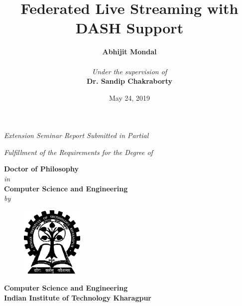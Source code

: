 \title{\bf{Federated Live Streaming with DASH Support}}
\date{}
\author{}
\maketitle
\thispagestyle{empty}
\begin{center}
	\vspace*{5mm}
	\textit{Extension Seminar Report Submitted in Partial}
	\par
	\vspace*{4mm}
	\textit{Fulfillment of the Requirements for the Degree of}
	\par
	\vspace*{5mm}
	{\large\textbf{Doctor of Philosophy}\\
		\vspace*{2mm}\textit{in}\\
		\vspace*{2mm}\large\textbf{Computer Science and Engineering}
		\\\vspace*{2mm}\textit{by}\\
		\vspace*{2mm}}
	\author{\large\textbf{Abhijit Mondal}\\
		\vspace*{2mm}{\small{[Roll No - 15CS91R09]}}\\
		\vspace*{15mm}\textit{Under the supervision of}\\
		\vspace*{2mm}\textbf{Dr. Sandip Chakraborty}\\}
	\vspace*{30mm}
	\begin{figure}[!ht]
		\centering
		\includegraphics[width=3cm]{img/iit_logo}
	\end{figure}
	\bf{Computer Science and Engineering
		\\Indian Institute of Technology Kharagpur
	}\\
	\date{May 24, 2019}
\end{center}
\newpage